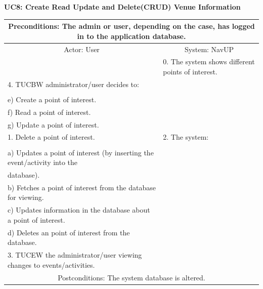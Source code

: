 \documentclass{article}
\begin{document}
				\vspace{5mm}
                \begin{flushleft}
                \textbf{UC8: Create Read Update and Delete(CRUD) Venue Information}\\
                \end{flushleft}
        		\centering		
       		 \small
       		 \begin{tabular}{|p{8cm}|p{8cm}|}
       		 \hline
       		 \multicolumn{2}{c}{Preconditions: The admin or user, depending on the case, has logged in to the application database.} \\
       		 \hline
       		\multicolumn{1}{c}{Actor: User} & \multicolumn{1}{c}{ System: NavUP} \\
        		\hline
       		 & 0.	The system shows different points of interest.\\
       		 \hline
       		4.	TUCBW administrator/user decides to:\\

\\e)	Create a point of interest.
\\f)	Read a point of interest.
\\g)	Update a point of interest.
\\1.	Delete a point of interest.

 				&2.	The system:\\

\\a)	Updates a point of interest (by inserting the event/activity into the \\database).
\\b)	Fetches a point of interest from the database for viewing.
\\c)	Updates information in the database about a point of interest.
\\d)	Deletes an point of interest from the database.
\\
        		\hline
       		 	3.	TUCEW the administrator/user viewing changes to events/activities. &\\
       		 \hline
        		\multicolumn{2}{c}{Postconditions: The system database is altered.} \\
        		\hline
        \end{tabular} 
       
\end{document}
